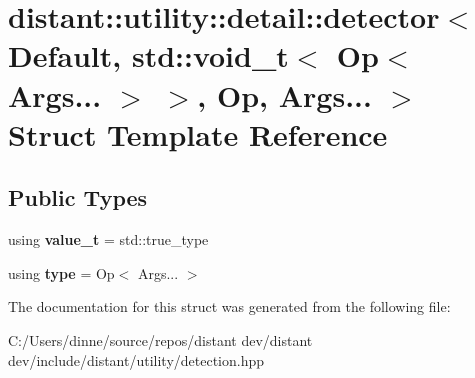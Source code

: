 \hypertarget{structdistant_1_1utility_1_1detail_1_1detector_3_01_default_00_01std_1_1void__t_3_01_op_3_01_arg04e1ee669e2093134af6db72a2dfc0d6}{}\section{distant\+:\+:utility\+:\+:detail\+:\+:detector$<$ Default, std\+:\+:void\+\_\+t$<$ Op$<$ Args... $>$ $>$, Op, Args... $>$ Struct Template Reference}
\label{structdistant_1_1utility_1_1detail_1_1detector_3_01_default_00_01std_1_1void__t_3_01_op_3_01_arg04e1ee669e2093134af6db72a2dfc0d6}
\subsection*{Public Types}
\begin{DoxyCompactItemize}
\item 
\mbox{\label{structdistant_1_1utility_1_1detail_1_1detector_3_01_default_00_01std_1_1void__t_3_01_op_3_01_arg04e1ee669e2093134af6db72a2dfc0d6_af0de3097b60600cc721bfb00e3ed5b18}} 
using {\bfseries value\+\_\+t} = std\+::true\+\_\+type
\item 
\mbox{\label{structdistant_1_1utility_1_1detail_1_1detector_3_01_default_00_01std_1_1void__t_3_01_op_3_01_arg04e1ee669e2093134af6db72a2dfc0d6_acefbdcfec94395ff7cb144c8283033da}} 
using {\bfseries type} = Op$<$ Args... $>$
\end{DoxyCompactItemize}


The documentation for this struct was generated from the following file\+:\begin{DoxyCompactItemize}
\item 
C\+:/\+Users/dinne/source/repos/distant dev/distant dev/include/distant/utility/detection.\+hpp\end{DoxyCompactItemize}
